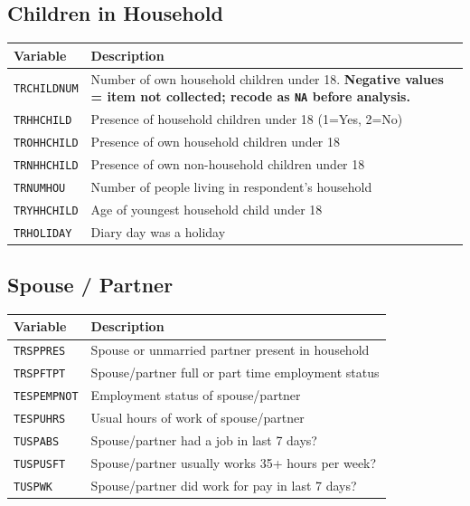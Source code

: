 \documentclass[11pt, a4paper]{article}
\begin{document}
\subsection{Children in Household}
\begin{longtable}{L{3.5cm} L{12cm}}
\toprule \textbf{Variable} & \textbf{Description} \\ \midrule \endhead
\bottomrule \endfoot
\texttt{TRCHILDNUM}  & Number of own household children under 18.
                       \textbf{Negative values = item not collected; recode as
                       \texttt{NA} before analysis.} \\
 \texttt{TRHHCHILD}   & Presence of household children under 18 (1=Yes, 2=No) \\
\texttt{TROHHCHILD}  & Presence of own household children under 18 \\
 \texttt{TRNHHCHILD}  & Presence of own non-household children under 18 \\
\texttt{TRNUMHOU}    & Number of people living in respondent's household \\
 \texttt{TRYHHCHILD}  & Age of youngest household child under 18 \\
\texttt{TRHOLIDAY}   & Diary day was a holiday \\
\end{longtable}

\subsection{Spouse / Partner}
\begin{longtable}{L{3.5cm} L{12cm}}
\toprule \textbf{Variable} & \textbf{Description} \\ \midrule \endhead
\bottomrule \endfoot
\texttt{TRSPPRES}    & Spouse or unmarried partner present in household \\
 \texttt{TRSPFTPT}    & Spouse/partner full or part time employment status \\
\texttt{TESPEMPNOT}  & Employment status of spouse/partner \\
 \texttt{TESPUHRS}    & Usual hours of work of spouse/partner \\
\texttt{TUSPABS}     & Spouse/partner had a job in last 7 days? \\
 \texttt{TUSPUSFT}    & Spouse/partner usually works 35+ hours per week? \\
\texttt{TUSPWK}      & Spouse/partner did work for pay in last 7 days? \\
\end{longtable}
\end{document}
